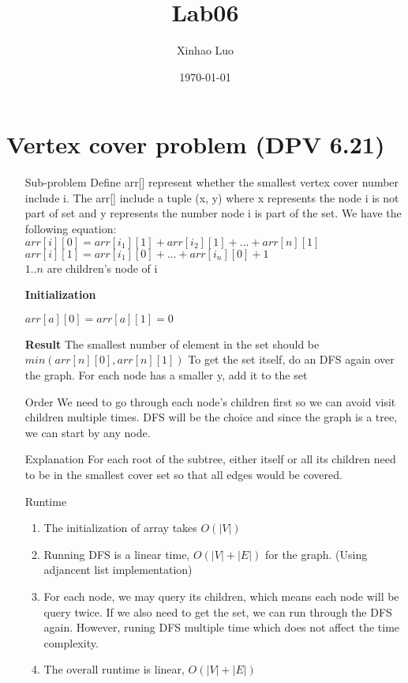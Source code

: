 \documentclass{article}
\title{Lab06}
\author{Xinhao Luo}
\date{\today}
\begin{document}
\maketitle

\newpage

\section{Vertex cover problem (DPV 6.21)}

\begin{itemize}
    \item [Sub-problem] Define arr[] represent whether the smallest vertex cover number include i. The arr[] include a tuple (x, y) where x represents the node i is not part of set and y represents the number node i is part of the set.
    We have the following equation: \\
    $arr[i][0] = arr[i_1][1] + arr[i_2][1] + ... + arr[n][1]$ \\
    $arr[i][1] = arr[i_1][0] + ... + arr[i_n][0] + 1$ \\
    
    $1..n$ are children's node of i

    \textbf{Initialization}
    
    $arr[a][0] = arr[a][1] = 0$
    
    \textbf{Result}
    The smallest number of element in the set should be $min(arr[n][0], arr[n][1])$
    To get the set itself, do an DFS again over the graph. For each node has a smaller y, add it to the set
    
    \item [Order] We need to go through each node's children first so we can avoid visit children multiple times. DFS will be the choice and since the graph is a tree, we can start by any node. 

    \item [Explanation] For each root of the subtree, either itself or all its children need to be in the smallest cover set so that all edges would be covered. 
    
    \item [Runtime] 
        \begin{enumerate}[1]
            \item The initialization of array takes $O(|V|)$
            \item Running DFS is a linear time, $O(|V| + |E|)$ for the graph. (Using adjancent list implementation)
            \item For each node, we may query its children, which means each node will be query twice. If we also need to get the set, we can run through the DFS again. However, runing DFS multiple time which does not affect the time complexity.
            \item The overall runtime is linear, $O(|V| + |E|)$
        \end{enumerate}
\end{itemize}
\end{document}
